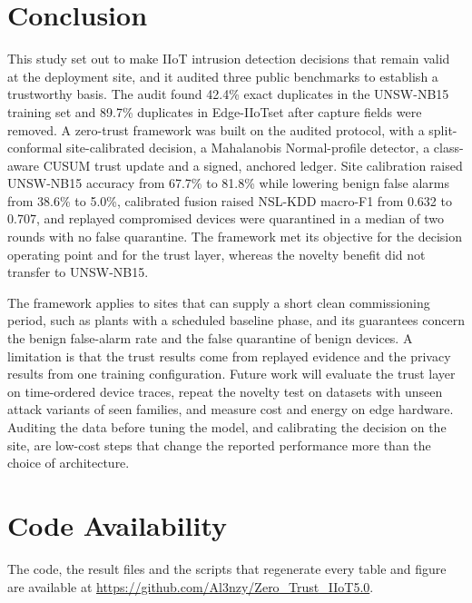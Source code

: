 \documentclass[journal]{IEEEtran}
\begin{document}
\section{Conclusion}\label{sec:conclusion}
This study set out to make IIoT intrusion detection decisions that remain valid at the deployment site, and it audited three public benchmarks to establish a trustworthy basis. The audit found 42.4\% exact duplicates in the UNSW-NB15 training set and 89.7\% duplicates in Edge-IIoTset after capture fields were removed. A zero-trust framework was built on the audited protocol, with a split-conformal site-calibrated decision, a Mahalanobis Normal-profile detector, a class-aware CUSUM trust update and a signed, anchored ledger. Site calibration raised UNSW-NB15 accuracy from 67.7\% to 81.8\% while lowering benign false alarms from 38.6\% to 5.0\%, calibrated fusion raised NSL-KDD macro-F1 from 0.632 to 0.707, and replayed compromised devices were quarantined in a median of two rounds with no false quarantine. The framework met its objective for the decision operating point and for the trust layer, whereas the novelty benefit did not transfer to UNSW-NB15.

The framework applies to sites that can supply a short clean commissioning period, such as plants with a scheduled baseline phase, and its guarantees concern the benign false-alarm rate and the false quarantine of benign devices. A limitation is that the trust results come from replayed evidence and the privacy results from one training configuration. Future work will evaluate the trust layer on time-ordered device traces, repeat the novelty test on datasets with unseen attack variants of seen families, and measure cost and energy on edge hardware. Auditing the data before tuning the model, and calibrating the decision on the site, are low-cost steps that change the reported performance more than the choice of architecture.

\section*{Code Availability}
The code, the result files and the scripts that regenerate every table and figure are available at \url{https://github.com/Al3nzy/Zero_Trust_IIoT5.0}.



\end{document}
